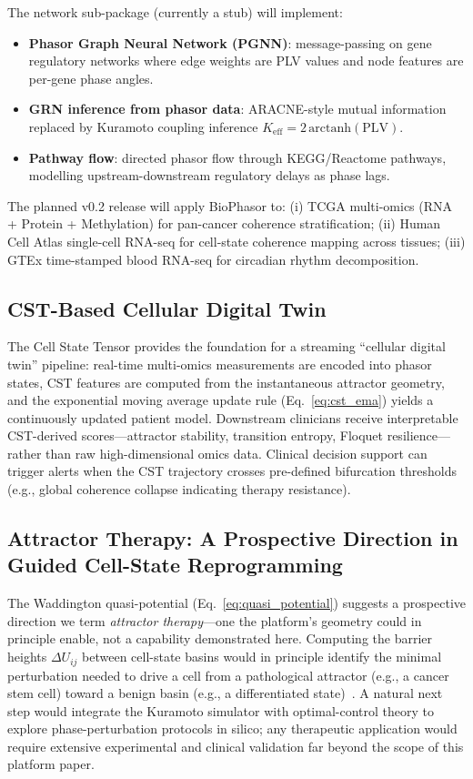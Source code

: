 \documentclass[preprint,12pt,amsmath,amssymb,superscriptaddress,floatfix]{revtex4-2}
\begin{document}
The network sub-package (currently a stub) will implement:
\begin{itemize}
    \item \textbf{Phasor Graph Neural Network (PGNN)}: message-passing
    on gene regulatory networks where edge weights are PLV values and
    node features are per-gene phase angles.
    \item \textbf{GRN inference from phasor data}: ARACNE-style mutual
    information replaced by Kuramoto coupling inference
    $K_{\mathrm{eff}} = 2\,\mathrm{arctanh}(\mathrm{PLV})$.
    \item \textbf{Pathway flow}: directed phasor flow through KEGG/Reactome
    pathways, modelling upstream-downstream regulatory delays as phase lags.
\end{itemize}

The planned v0.2 release will apply BioPhasor to:
(i) TCGA multi-omics (RNA + Protein + Methylation) for pan-cancer coherence
stratification;
(ii) Human Cell Atlas single-cell RNA-seq for cell-state coherence mapping
across tissues;
(iii) GTEx time-stamped blood RNA-seq for circadian rhythm decomposition.

\subsection{CST-Based Cellular Digital Twin}

The Cell State Tensor provides the foundation for a streaming
``cellular digital twin'' pipeline: real-time multi-omics measurements
are encoded into phasor states, CST features are computed from the
instantaneous attractor geometry, and the exponential moving average
update rule (Eq.~\ref{eq:cst_ema}) yields a continuously updated
patient model.  Downstream clinicians receive interpretable
CST-derived scores---attractor stability, transition entropy, Floquet
resilience---rather than raw high-dimensional omics data.  Clinical
decision support can trigger alerts when the CST trajectory crosses
pre-defined bifurcation thresholds (e.g., global coherence collapse
indicating therapy resistance).

\subsection{Attractor Therapy: A Prospective Direction in Guided Cell-State Reprogramming}

The Waddington quasi-potential (Eq.~\ref{eq:quasi_potential}) suggests a
prospective direction we term \emph{attractor therapy}---one the platform's
geometry could in principle enable, not a capability demonstrated here.
Computing the barrier heights $\Delta U_{ij}$ between cell-state basins would in
principle identify the minimal perturbation needed to drive a cell from a
pathological attractor (e.g., a cancer stem cell) toward a benign basin (e.g.,
a differentiated state)~\cite{ref_wang2015}. A natural next step would integrate
the Kuramoto simulator with optimal-control theory to explore phase-perturbation
protocols in silico; any therapeutic application would require extensive
experimental and clinical validation far beyond the scope of this platform
paper.
\end{document}
